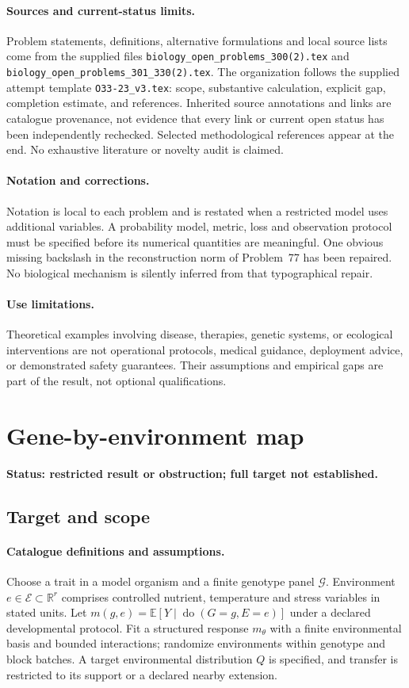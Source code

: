 \documentclass[11pt]{article}
\begin{document}
\paragraph{Sources and current-status limits.}
Problem statements, definitions, alternative formulations and local source lists
come from the supplied files
\texttt{biology\_open\_problems\_300(2).tex} and
\texttt{biology\_open\_problems\_301\_330(2).tex}.
The organization follows the supplied attempt template
\texttt{O33-23\_v3.tex}: scope, substantive calculation, explicit gap,
completion estimate, and references. Inherited source annotations and links are
catalogue provenance, not evidence that every link or current open status has
been independently rechecked. Selected methodological references appear at the
end. No exhaustive literature or novelty audit is claimed.

\paragraph{Notation and corrections.}
Notation is local to each problem and is restated when a restricted model uses
additional variables. A probability model, metric, loss and observation protocol
must be specified before its numerical quantities are meaningful. One obvious
missing backslash in the reconstruction norm of Problem~77 has been repaired.
No biological mechanism is silently inferred from that typographical repair.

\paragraph{Use limitations.}
Theoretical examples involving disease, therapies, genetic systems, or ecological
interventions are not operational protocols, medical guidance, deployment advice,
or demonstrated safety guarantees. Their assumptions and empirical gaps are part
of the result, not optional qualifications.


\section*{Gene-by-environment map}
\label{prob:026}
\noindent\textbf{Status: restricted result or obstruction; full target not established.}
\subsection{Target and scope}
\paragraph{Catalogue definitions and assumptions.}
Choose a trait in a model organism and a finite genotype panel $\mathcal G$. Environment $e\in\mathcal E\subset\mathbb{R}^r$ comprises controlled nutrient, temperature and stress variables in stated units. Let $m(g,e)=\mathbb{E}[Y\mid\operatorname{do}(G=g,E=e)]$ under a declared developmental protocol. Fit a structured response $m_\theta$ with a finite environmental basis and bounded interactions; randomize environments within genotype and block batches. A target environmental distribution $Q$ is specified, and transfer is restricted to its support or a declared nearby extension.
\end{document}
